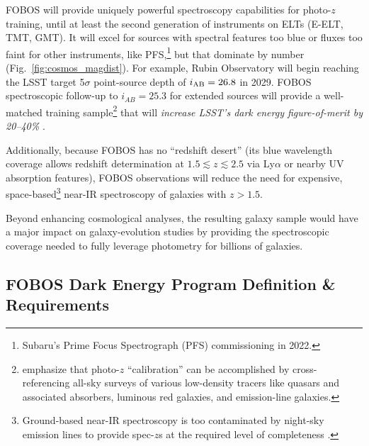 \documentclass[11pt,a4paper,twoside,onecolumn,openany,final,oldfontcommands]{memoir}
\begin{document}
FOBOS will provide uniquely powerful spectroscopy capabilities for photo-$z$ training, until at least the second generation of instruments on ELTs (E-ELT, TMT, GMT).  It will excel for sources with spectral features too blue or fluxes too faint for other instruments, like PFS,\footnote{Subaru's Prime Focus Spectrograph (PFS) commissioning in 2022.} but that dominate by number (Fig.~\ref{fig:cosmos_magdist}).  For example, Rubin Observatory will begin reaching the LSST target 5$\sigma$ point-source depth of $i_{\rm AB} = 26.8$ in 2029.   FOBOS spectroscopic follow-up to $i_{AB} = 25.3$ for extended sources will provide a well-matched training sample\footnote{\citet{newman15} emphasize that photo-$z$ ``calibration'' can be accomplished by cross-referencing all-sky surveys of various low-density tracers like quasars and associated absorbers, luminous red galaxies, and emission-line galaxies.} that will \textit{increase LSST's dark energy figure-of-merit by 20--40\%} \citep{newman15}. 

 Additionally, because FOBOS has no ``redshift desert'' (its blue wavelength coverage allows redshift determination at $1.5\lesssim z \lesssim2.5$ via Ly$\alpha$ or nearby UV absorption features), FOBOS observations will reduce the need for expensive, space-based\footnote{Ground-based near-IR spectroscopy is too contaminated by night-sky emission lines to provide spec-$z$s at the required level of completeness \citep{newman15}.} near-IR spectroscopy of galaxies with $z > 1.5$.  

 Beyond enhancing cosmological analyses, the resulting galaxy sample would have a major impact on galaxy-evolution studies by providing the spectroscopic coverage needed to fully leverage photometry for billions of galaxies.  %


\subsection{FOBOS Dark Energy Program Definition \& Requirements}

\end{document}
